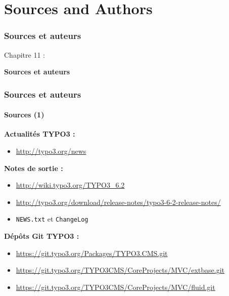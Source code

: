 %

\section{Sources and Authors}
\begin{frame}[fragile]
	\frametitle{Sources et auteurs}

	\begin{center}\huge{Chapitre 11 :}\end{center}
	\begin{center}\huge{\color{typo3darkgrey}\textbf{Sources et auteurs}}\end{center}

\end{frame}


\begin{frame}[fragile]
	\frametitle{Sources et auteurs}
	\framesubtitle{Sources (1)}

	\textbf{Actualités TYPO3 :}
		\begin{itemize}\smaller
			\item \url{http://typo3.org/news}
		\end{itemize}

	\textbf{Notes de sortie :}
		\begin{itemize}\smaller
			\item \url{http://wiki.typo3.org/TYPO3_6.2}
			\item \url{http://typo3.org/download/release-notes/typo3-6-2-release-notes/}
			\item \texttt{NEWS.txt} et \texttt{ChangeLog}
		\end{itemize}

	\textbf{Dépôts Git TYPO3 :}
		\begin{itemize}\smaller
			\item \url{https://git.typo3.org/Packages/TYPO3.CMS.git}
			\item \url{https://git.typo3.org/TYPO3CMS/CoreProjects/MVC/extbase.git}
			\item \url{https://git.typo3.org/TYPO3CMS/CoreProjects/MVC/fluid.git}
		\end{itemize}

\end{frame}

